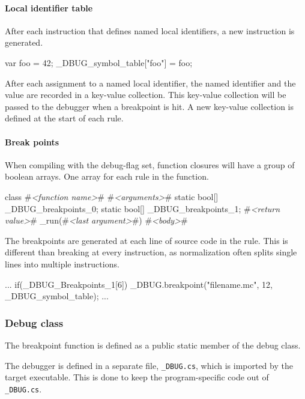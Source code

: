 \paragraph{Local identifier table}
After each instruction that defines named local identifiers, a new instruction is generated.

\begin{CS}
    var foo = 42;
    _DBUG_symbol_table["foo"] = foo;
\end{CS}

After each assignment to a named local identifier, the named identifier and the value are recorded in a key-value collection. 
This key-value collection will be passed to the debugger when a breakpoint is hit.
A new key-value collection is defined at the start of each rule.

\paragraph{Break points}
When compiling with the debug-flag set, function closures will have a group of boolean arrays.
One array for each rule in the function.

\begin{CS}[escapeinside=\#\#]
    class #\textit{<function name>}#{
        #\textit{<arguments>}#
        static bool[] _DBUG_breakpoints_0;
        static bool[] _DBUG_breakpoints_1;
        #\textit{<return value>}# _run(#\textit{<last argument>}#){
            #\textit{<body>}#
        }
    }
\end{CS}

The breakpoints are generated at each line of source code in the rule.
This is different than breaking at every instruction, as normalization often splits single lines into multiple instructions.

\begin{CS}
    ...
    if(_DBUG_Breakpoints_1[6]){
        _DBUG.breakpoint("filename.mc", 12, 
                         _DBUG_symbol_table);
    }
    ...
\end{CS}

\subsubsection{Debug class}
The breakpoint function is defined as a public static member of the debug class.

The debugger is defined in a separate file, \verb|_DBUG.cs|, which is imported by the target executable.
This is done to keep the program-specific code out of \verb|_DBUG.cs|.


